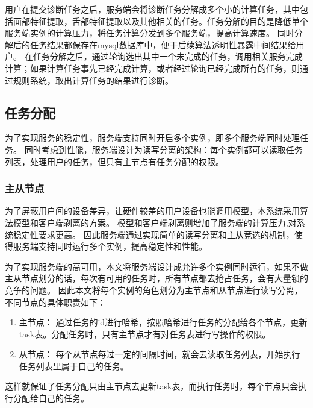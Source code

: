 用户在提交诊断任务之后，服务端会将诊断任务分解成多个小的计算任务，其中包括面部特征提取，舌部特征提取以及其他相关的任务。任务分解的目的是降低单个服务端实例的计算压力，将任务计算分发到多个服务端，提高计算速度。
同时分解后的任务结果都保存在mysql数据库中，便于后续算法透明性暴露中间结果给用户。
在任务分解之后，通过轮询选出其中一个未完成的任务，调用相关服务完成计算；如果计算任务事先已经完成计算，或者经过轮询已经完成所有的任务，则通过规则系统，取出计算任务的结果进行诊断。



\subsection{任务分配}
为了实现服务的稳定性，服务端支持同时开启多个实例，即多个服务端同时处理任务。
同时考虑到性能，服务端设计为读写分离的架构：每个实例都可以读取任务列表，处理用户的任务，但只有主节点有任务分配的权限。


\subsubsection{主从节点}
为了屏蔽用户间的设备差异，让硬件较差的用户设备也能调用模型，本系统采用算法模型和客户端剥离的方案。
模型和客户端剥离则增加了服务端的计算压力,对系统稳定性要求更高。
因此服务端通过实现简单的读写分离和主从竞选的机制，使得服务端支持同时运行多个实例，提高稳定性和性能。


为了实现服务端的高可用，本文将服务端设计成允许多个实例同时运行，如果不做主从节点划分的话，每次有可用的任务时，所有节点都去抢占任务，会有大量锁的竞争的问题。
因此本文将每个实例的角色划分为主节点和从节点进行读写分离，不同节点的具体职责如下：

\begin{enumerate}
    \item 主节点： 通过任务的id进行哈希，按照哈希进行任务的分配给各个节点，更新task表。分配任务时，只有主节点才有对任务表进行写操作的权限。

    \item 从节点： 每个从节点每过一定的间隔时间，就会去读取任务列表，开始执行任务列表里属于自己的任务。  

\end{enumerate}

这样就保证了任务分配只由主节点去更新task表，而执行任务时，每个节点只会执行分配给自己的任务。

